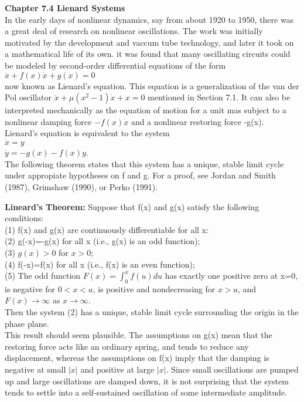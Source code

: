 \documentclass{article}
\newcommand\tab[1][1cm]{\hspace*{#1}}
\begin{document}
\textbf {Chapter 7.4 Lienard Systems} \\
In the early days of nonlinear dynamics, say from about 1920 to 1950, there was a great deal of research on nonlinear oscillations. The work was initially motivated by the development and vaccum tube technology, and later it took on a mathematical life of its own. it was found that many oscillating circuits could be modeled by second-order differential equations of the form
\\ \tab
$\ddot{x}+f(x)\dot{x}+g(x)=0$ \\
now known as Lienard's equation. This equation is a generalization of the van der Pol oscillator $\ddot{x}+\mu (x^{2}-1)\dot{x}+x=0$ mentioned in Section 7.1. It can also be interpreted mechanically as the equation of motion for a unit mas subject to a nonlinear damping force $-f(x)\dot{x}$ and a nonlinear restoring force -g(x). \\ \tab
Lienard's equation is equivalent to the system \\ \tab
$\dot{x}=y$ \\ \tab
$\dot{y}=-g(x)-f(x)y$. \\
The following theorem states that this system has a unique, stable limit cycle under appropiate hypotheses on f and g. For a proof, see Jordan and Smith (1987), Grimshaw (1990), or Perko (1991). 

\textbf {Lineard's Theorem:} Suppose that f(x) and g(x) satisfy the following conditions: \\ \tab
(1) f(x) and g(x) are continuously differentiable for all x: \\ \tab
(2) g(-x)=-g(x) for all x (i.e., g(x) is an odd function); \\ \tab
(3) $g(x)> 0$ for $x>0$; \\ \tab
(4) f(-x)=f(x) for all x (i.e., f(x) is an even function); \\ \tab
(5) The odd function $F(x)= \int_{0}^{x}f(u)du$ has exactly one positive zero at x=0, is negative for $0<x<a$, is positive and nondecreasing for $x>a$, and $F(x) \to \infty$ as $x \to \infty$. \\ \tab
Then the system (2) has a unique, stable limit cycle surrounding the origin in the phase plane. \\ \tab
This result should seem plausible. The assumptions on g(x) mean that the restoring force acts like an ordinary spring, and tends to reduce any displacement, whereas the assumptions on f(x) imply that the damping is negative at small $|x|$ and positive at large $|x|$. Since small oscillations are pumped up and large oscillations are damped down, it is not surprising that the system tends to settle into a self-sustained oscillation of some intermediate amplitude.
\end{document}
